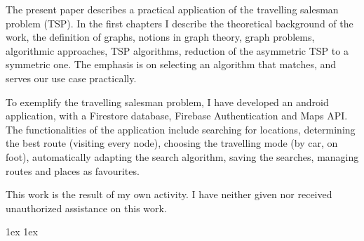 \documentclass[final]{ubb_dolgozat}
\author{%
Lorenzovici Zsombor
}
\begin{document}
\begin{abstractEN} %


The present paper describes a practical application of the travelling salesman problem (TSP). In the first chapters I describe the theoretical background of the work, the definition of graphs, notions in graph theory, graph problems, algorithmic approaches, TSP algorithms, reduction of the asymmetric TSP to a symmetric one. The emphasis is on selecting an algorithm that matches, and serves our use case practically.

To exemplify the travelling salesman problem, I have developed an android application, with a Firestore database, Firebase Authentication and Maps API. The functionalities of the application include searching for locations, determining the best route (visiting every node), choosing the travelling mode (by car, on foot), automatically adapting the search algorithm, saving the searches, managing routes and places as favourites.

This work is the result of my own activity. I have neither given nor received unauthorized assistance on this work.

\end{abstractEN}

\maketitle


{ \baselineskip 1ex
  \parskip 1ex
  \tableofcontents
}






















\appendix


{ \renewcommand{\baselinestretch}{0.8}
  \normalsize 
  \setlength{\itemsep}{-2.4mm}
  \setlength{\bibspacing}{0.67\baselineskip}
  
  
}
\end{document}
